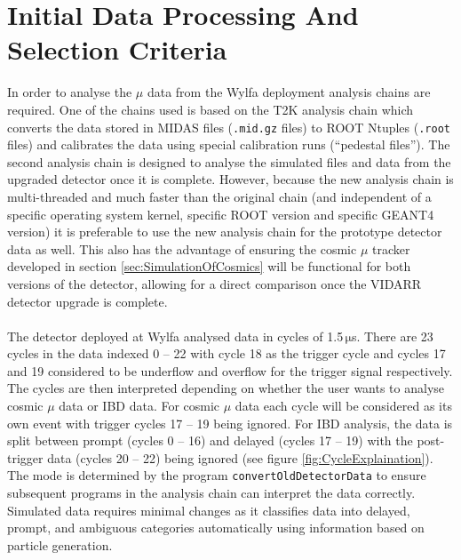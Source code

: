 \section{Initial Data Processing And Selection Criteria}\label{sec:muonAnalysisChain}
In order to analyse the $\mu$ data from the Wylfa deployment analysis chains are required. One of the chains used is based on the T2K analysis chain which converts the data stored in MIDAS \cite{ritt1997midas} files (\texttt{.mid.gz} files) to ROOT Ntuples (\texttt{.root} files) and calibrates the data using special calibration runs (``pedestal files''). The second analysis chain is designed to analyse the simulated files and data from the upgraded detector once it is complete. However, because the new analysis chain is multi-threaded and much faster than the original chain (and independent of a specific operating system kernel, specific ROOT version and specific GEANT4 version) it is preferable to use the new analysis chain for the prototype detector data as well. This also has the advantage of ensuring the cosmic $\mu$ tracker developed in section \ref{sec:SimulationOfCosmics} will be functional for both versions of the detector, allowing for a direct comparison once the VIDARR detector upgrade is complete. 
\\\\The detector deployed at Wylfa analysed data in cycles of 1.5\,$\mathrm{\mu}$s. There are 23 cycles in the data indexed 0 -- 22 with cycle 18 as the trigger cycle and cycles 17 and 19 considered to be underflow and overflow for the trigger signal respectively. The cycles are then interpreted depending on whether the user wants to analyse cosmic $\mu$ data or IBD data. For cosmic $\mu$ data each cycle will be considered as its own event with trigger cycles 17 -- 19 being ignored. For IBD analysis, the data is split between prompt (cycles 0 -- 16) and delayed (cycles 17 -- 19) with the post-trigger data (cycles 20 -- 22) being ignored (see figure \ref{fig:CycleExplaination}). The mode is determined by the program \texttt{convertOldDetectorData} to ensure subsequent programs in the analysis chain can interpret the data correctly. Simulated data requires minimal changes as it classifies data into delayed, prompt, and ambiguous categories automatically using information based on particle generation.

